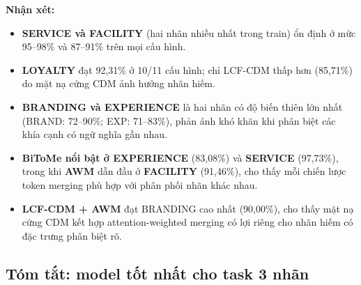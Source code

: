 \textbf{Nhận xét:}
\begin{itemize}
  \item \textbf{SERVICE và FACILITY} (hai nhãn nhiều nhất trong train)
        ổn định ở mức 95--98\% và 87--91\% trên mọi cấu hình.
  \item \textbf{LOYALTY} đạt 92,31\% ở 10/11 cấu hình; chỉ LCF-CDM
        thấp hơn (85,71\%) do mặt nạ cứng CDM ảnh hưởng nhãn hiếm.
  \item \textbf{BRANDING và EXPERIENCE} là hai nhãn có độ biến thiên
        lớn nhất (BRAND: 72--90\%; EXP: 71--83\%), phản ánh khó khăn
        khi phân biệt các khía cạnh có ngữ nghĩa gần nhau.
  \item \textbf{BiToMe nổi bật ở EXPERIENCE} (83,08\%) và \textbf{SERVICE}
        (97,73\%), trong khi \textbf{AWM} dẫn đầu ở \textbf{FACILITY}
        (91,46\%), cho thấy mỗi chiến lược token merging phù hợp với
        phân phối nhãn khác nhau.
  \item \textbf{LCF-CDM + AWM} đạt BRANDING cao nhất (90,00\%), cho
        thấy mặt nạ cứng CDM kết hợp attention-weighted merging có lợi
        riêng cho nhãn hiếm có đặc trưng phân biệt rõ.
\end{itemize}

\subsection{Tóm tắt: model tốt nhất cho task 3 nhãn}
\label{subsec:best_model_summary}

